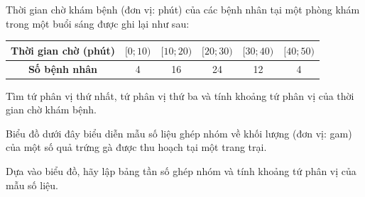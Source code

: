 \documentclass[12pt]{article}
\begin{document}
	\begin{btxanh}[title={Bài 2}]
		Thời gian chờ khám bệnh (đơn vị: phút) của các bệnh nhân tại một phòng khám trong một buổi sáng được ghi lại như sau:
		\begin{center}
			\renewcommand{\arraystretch}{1.3}
			\begin{tabular}{|c|c|c|c|c|c|}
				\hline
				\textbf{Thời gian chờ (phút)} & $[0; 10)$ & $[10; 20)$ & $[20; 30)$ & $[30; 40)$ & $[40; 50)$ \\
				\hline
				\textbf{Số bệnh nhân} & 4 & 16 & 24 & 12 & 4 \\
				\hline
			\end{tabular}
		\end{center}
		Tìm tứ phân vị thứ nhất, tứ phân vị thứ ba và tính khoảng tứ phân vị của thời gian chờ khám bệnh.
	\end{btxanh}
	
	\begin{btvang}[title={Bài 3}]
		Biểu đồ dưới đây biểu diễn mẫu số liệu ghép nhóm về khối lượng (đơn vị: gam) của một số quả trứng gà được thu hoạch tại một trang trại.
		\begin{center}
		\end{center}
		Dựa vào biểu đồ, hãy lập bảng tần số ghép nhóm và tính khoảng tứ phân vị của mẫu số liệu.
	\end{btvang}
	
\end{document}
